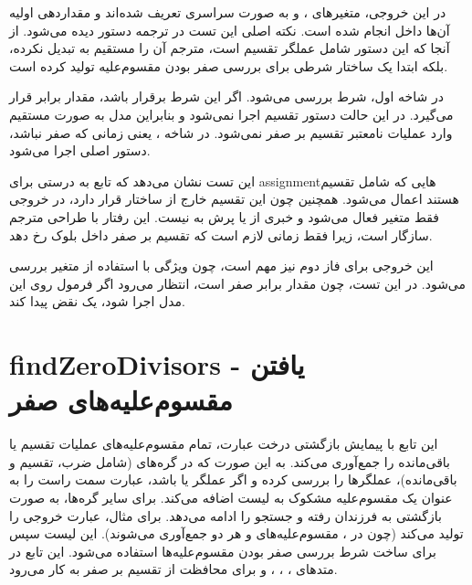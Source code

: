 \documentclass[12pt]{report}
\begin{document}
	در این خروجی، متغیرهای ،  و  به صورت سراسری تعریف شده‌اند و مقداردهی اولیه آن‌ها داخل  انجام شده است. 
	نکته اصلی این تست در ترجمه دستور  دیده می‌شود. 
	از آنجا که این دستور شامل عملگر تقسیم است، مترجم آن را مستقیم به  تبدیل نکرده، بلکه ابتدا یک ساختار شرطی برای بررسی صفر بودن مقسوم‌علیه تولید کرده است.
	
	در شاخه اول، شرط  بررسی می‌شود. 
	اگر این شرط برقرار باشد، مقدار  برابر  قرار می‌گیرد. 
	در این حالت دستور تقسیم اجرا نمی‌شود و بنابراین مدل به صورت مستقیم وارد عملیات نامعتبر تقسیم بر صفر نمی‌شود. 
	در شاخه ، یعنی زمانی که  صفر نباشد، دستور اصلی  اجرا می‌شود.
	
	این تست نشان می‌دهد که تابع  به درستی برای assignmentهایی که شامل تقسیم هستند اعمال می‌شود. 
	همچنین چون این تقسیم خارج از ساختار  قرار دارد، در خروجی فقط متغیر  فعال می‌شود و خبری از  یا پرش به  نیست. 
	این رفتار با طراحی مترجم سازگار است، زیرا  فقط زمانی لازم است که تقسیم بر صفر داخل بلوک  رخ دهد.
	
	این خروجی برای فاز دوم نیز مهم است، چون ویژگی  با استفاده از متغیر  بررسی می‌شود. 
	در این تست، چون مقدار  برابر صفر است، انتظار می‌رود اگر فرمول  روی این مدل اجرا شود،  یک نقض پیدا کند.
	
	\section{findZeroDivisors - یافتن مقسوم‌علیه‌های صفر}
	
	این تابع با پیمایش بازگشتی درخت عبارت، تمام مقسوم‌علیه‌های عملیات تقسیم یا باقی‌مانده را جمع‌آوری می‌کند. به این صورت که در گره‌های  (شامل ضرب، تقسیم و باقی‌مانده)، عملگرها را بررسی کرده و اگر عملگر \lr{/} یا \lr{\%} باشد، عبارت سمت راست را به عنوان یک مقسوم‌علیه مشکوک به لیست اضافه می‌کند. برای سایر گره‌ها، به صورت بازگشتی به فرزندان رفته و جستجو را ادامه می‌دهد. برای مثال، عبارت  خروجی \lr{["b", "c", "d"]} را تولید می‌کند (چون در ، مقسوم‌علیه‌های  و  هر دو جمع‌آوری می‌شوند). این لیست سپس برای ساخت شرط بررسی صفر بودن مقسوم‌علیه‌ها استفاده می‌شود. این تابع در متدهای ، ، ،  و  برای محافظت از تقسیم بر صفر به کار می‌رود.
	
\end{document}
